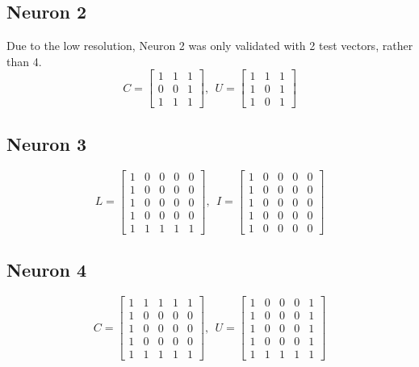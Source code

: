 \documentclass{article}
\begin{document}
	\subsection{Neuron 2}
	Due to the low resolution, Neuron 2 was only validated with 2 test vectors, rather than 4.
	\[
	C = 
	\begin{bmatrix}
	1 & 1 & 1 \\
	0 & 0 & 1 \\
	1 & 1 & 1
	\end{bmatrix}
	,~~U = 
	\begin{bmatrix}
	1 & 1 & 1 \\
	1 & 0 & 1 \\
	1 & 0 & 1
	\end{bmatrix}
	\]
	\subsection{Neuron 3}
	\[
	L = 
	\begin{bmatrix}
	1 & 0 & 0 & 0 & 0 \\
	1 & 0 & 0 & 0 & 0 \\
	1 & 0 & 0 & 0 & 0 \\
	1 & 0 & 0 & 0 & 0 \\
	1 & 1 & 1 & 1 & 1
	\end{bmatrix}
	,~~I = 
	\begin{bmatrix}
	1 & 0 & 0 & 0 & 0 \\
	1 & 0 & 0 & 0 & 0 \\
	1 & 0 & 0 & 0 & 0 \\
	1 & 0 & 0 & 0 & 0 \\
	1 & 0 & 0 & 0 & 0
	\end{bmatrix}
	\]
	\subsection{Neuron 4}
	\[
	C = 
	\begin{bmatrix}
	1 & 1 & 1 & 1 & 1 \\
	1 & 0 & 0 & 0 & 0 \\
	1 & 0 & 0 & 0 & 0 \\
	1 & 0 & 0 & 0 & 0 \\
	1 & 1 & 1 & 1 & 1
	\end{bmatrix}
	,~~U = 
	\begin{bmatrix}
	1 & 0 & 0 & 0 & 1 \\
	1 & 0 & 0 & 0 & 1 \\
	1 & 0 & 0 & 0 & 1 \\
	1 & 0 & 0 & 0 & 1 \\
	1 & 1 & 1 & 1 & 1
	\end{bmatrix}
	\]
\end{document}

